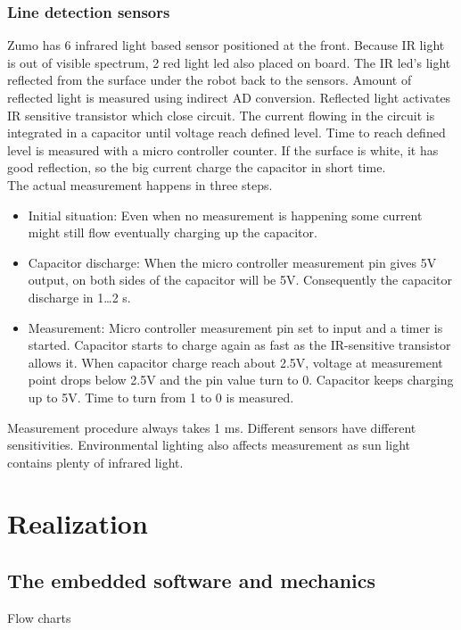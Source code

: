 \documentclass[11pt,a4paper,oneside,article]{memoir}
\begin{document}
\subsection{Line detection sensors}
Zumo has 6 infrared light based sensor positioned at the front. Because IR light is out of visible spectrum, 2 red light led also placed on board. The IR led's light reflected from the surface under the robot back to the sensors. Amount of reflected light is measured using indirect AD conversion. Reflected light activates IR sensitive transistor which close circuit. The current flowing in the circuit is integrated in a capacitor until voltage reach defined level. Time to reach defined level is measured with a micro controller counter. If the surface is white, it has good reflection, so the big current charge the capacitor in short time.\\
The actual measurement happens in three steps.
\begin{itemize}
	\item Initial situation: Even when no measurement is happening some current might still flow eventually charging up the capacitor.
	\item Capacitor discharge: When the micro controller measurement pin gives 5V output, on both sides of the capacitor will be 5V. Consequently the capacitor discharge in 1\ldots2 \textmu s.
	\item Measurement: Micro controller measurement pin set to input and a timer is started. Capacitor starts to charge again as fast as the IR-sensitive transistor allows it. When capacitor charge reach about 2.5V, voltage at measurement point drops below 2.5V and the pin value turn to 0. Capacitor keeps charging up to 5V. Time to turn from 1 to 0 is measured.
\end{itemize}
Measurement procedure always takes 1 ms. Different sensors have different sensitivities. Environmental lighting also affects measurement as sun light contains plenty of infrared light.\cite{Lectures}

\chapter{Realization}

\section{The embedded software and mechanics}
Flow charts
\end{document}
